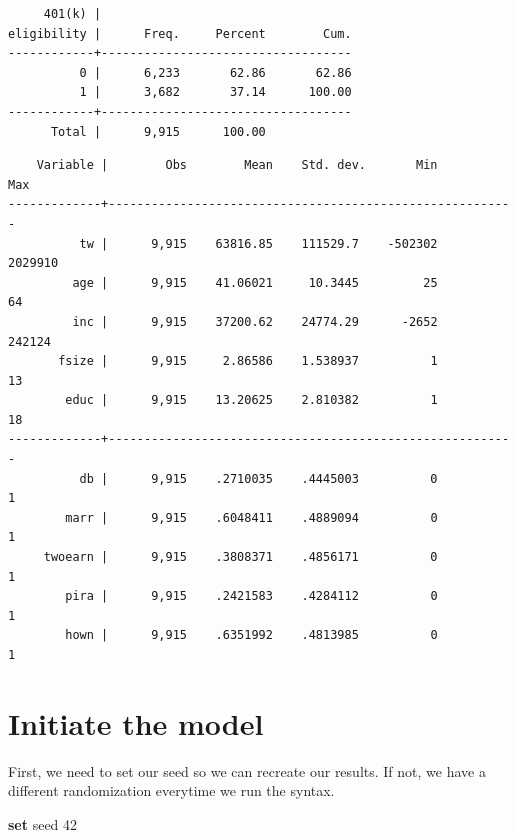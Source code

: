 \documentclass[
]{book}
\newenvironment{Shaded}{\begin{snugshade}}{\end{snugshade}}
\newcommand{\DecValTok}[1]{\textcolor[rgb]{0.00,0.00,0.81}{#1}}
\newcommand{\KeywordTok}[1]{\textcolor[rgb]{0.13,0.29,0.53}{\textbf{#1}}}
\newcommand{\NormalTok}[1]{#1}
\newcommand{\OtherTok}[1]{\textcolor[rgb]{0.56,0.35,0.01}{#1}}
\begin{document}
\begin{Shaded}
\end{Shaded}

\begin{verbatim}
     401(k) |
eligibility |      Freq.     Percent        Cum.
------------+-----------------------------------
          0 |      6,233       62.86       62.86
          1 |      3,682       37.14      100.00
------------+-----------------------------------
      Total |      9,915      100.00
\end{verbatim}

\begin{Shaded}
\end{Shaded}

\begin{verbatim}
    Variable |        Obs        Mean    Std. dev.       Min        Max
-------------+---------------------------------------------------------
          tw |      9,915    63816.85    111529.7    -502302    2029910
         age |      9,915    41.06021     10.3445         25         64
         inc |      9,915    37200.62    24774.29      -2652     242124
       fsize |      9,915     2.86586    1.538937          1         13
        educ |      9,915    13.20625    2.810382          1         18
-------------+---------------------------------------------------------
          db |      9,915    .2710035    .4445003          0          1
        marr |      9,915    .6048411    .4889094          0          1
     twoearn |      9,915    .3808371    .4856171          0          1
        pira |      9,915    .2421583    .4284112          0          1
        hown |      9,915    .6351992    .4813985          0          1
\end{verbatim}

\section{Initiate the model}\label{initiate-the-model}

First, we need to set our seed so we can recreate our results. If not, we have a different randomization everytime we run the syntax.

\begin{Shaded}
\begin{Highlighting}[]
\KeywordTok{set} \DecValTok{seed}\NormalTok{ 42}
\end{Highlighting}
\end{Shaded}
\end{document}
